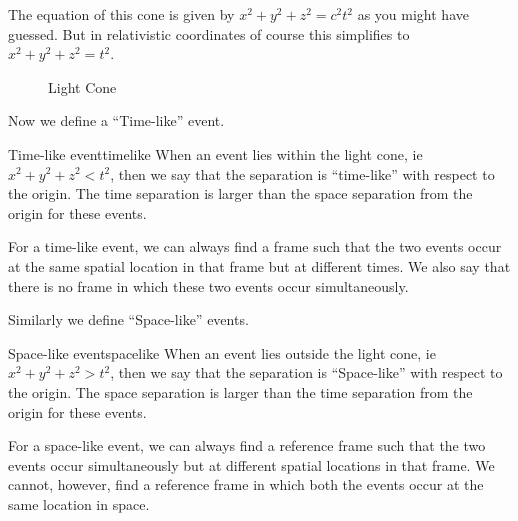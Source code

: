 \documentclass[16pt]{scrartcl}
\numberwithin{equation}{section}
\theoremstyle{plain}
\theoremstyle{definition}
\begin{document}
The equation of this cone is given by $x^2 + y^2 + z^2 = c^2 t^2$ as you might have guessed. But in relativistic coordinates of course this simplifies to $x^2 + y^2 + z^2 = t^2$.

\begin{figure}
    \centering
    \caption{Light Cone}
    \label{fig:light-cone}
\end{figure}

Now we define a ``Time-like'' event.

\begin{defn}{Time-like event}{timelike}
    When an event lies within the light cone, ie $x^2+y^2+z^2 < t^2$, then we say that the separation is ``time-like'' with respect to the origin. The time separation is larger than the space separation from the origin for these events.
\end{defn}

For a time-like event, we can always find a frame such that the two events occur at the same spatial location in that frame but at different times. We also say that there is no frame in which these two events occur simultaneously.

Similarly we define ``Space-like'' events.

\begin{defn}{Space-like event}{spacelike}
    When an event lies outside the light cone, ie $x^2+y^2+z^2 > t^2$, then we say that the separation is ``Space-like'' with respect to the origin. The space separation is larger than the time separation from the origin for these events.
\end{defn}

For a space-like event, we can always find a reference frame such that the two events occur simultaneously but at different spatial locations in that frame. We cannot, however, find a reference frame in which both the events occur at the same location in space.
\end{document}
